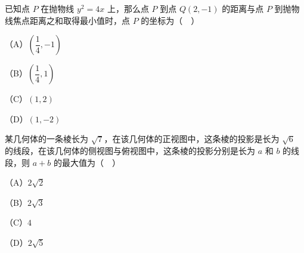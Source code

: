 \begin{question}
已知点 $P$ 在抛物线 $y^2=4x$ 上，那么点 $P$ 到点 $Q(2,-1)$ 的距离与点 $P$ 到抛物线焦点距离之和取得最小值时，点 $P$ 的坐标为（　）

（A）$\left(\dfrac14,-1\right)$

（B）$\left(\dfrac14,1\right)$

（C）$(1,2)$

（D）$(1,-2)$

\end{question}
\begin{question}
某几何体的一条棱长为 $\sqrt7$，在该几何体的正视图中，这条棱的投影是长为 $\sqrt6$ 的线段，在该几何体的侧视图与俯视图中，这条棱的投影分别是长为 $a$ 和 $b$ 的线段，则 $a+b$ 的最大值为（　）

（A）$2\sqrt2$

（B）$2\sqrt3$

（C）$4$

（D）$2\sqrt5$

\end{question}

